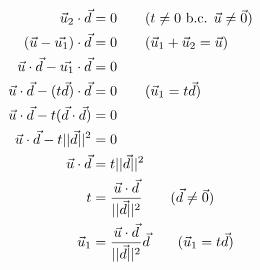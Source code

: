\documentclass[pdf,9pt]{beamer}
\begin{document}
{\begin{frame}[fragile]
\begin{align}
    \vec{u}_2 \dotprod\vec{d}                        & = 0 \tag{$t\ne 0$ b.c. $\vec{u}\ne \vec{0}  $}                            \\
    (\vec{u}-\vec{u_1})\dotprod\vec{d}               & = 0 \tag{$\vec{u}_1+\vec{u}_2=\vec{u}$}                                   \\
    \vec{u}\dotprod\vec{d}-\vec{u_1}\dotprod\vec{d}  & = 0 \notag                                                                \\
    \vec{u}\dotprod\vec{d}-(t\vec{d})\dotprod\vec{d} & = 0 \tag{$\vec{u}_1=t \vec{d}$}                                           \\
    \vec{u}\dotprod\vec{d}-t(\vec{d}\dotprod\vec{d}) & = 0 \notag                                                                \\
    \vec{u}\dotprod\vec{d}-t||\vec{d}||^2            & = 0 \notag                                                                \\
    \vec{u}\dotprod\vec{d}                           & = t||\vec{d}||^2\notag                                                    \\
    t                                                & = \frac{\vec{u}\dotprod\vec{d}}{||\vec{d}||^2} \tag{$\vec{d}\ne \vec{0}$} \\
    \vec{u}_1                                        & = \frac{\vec{u}\dotprod\vec{d}}{||\vec{d}||^2}\vec{d} \tag{$\vec{u}_1=t \vec{d}$}
\end{align}
\end{frame}
}
\end{document}
